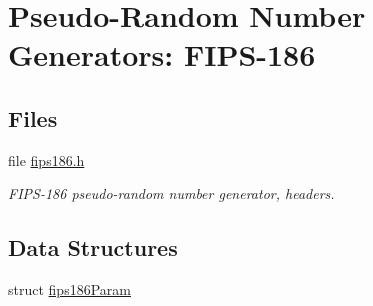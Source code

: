 \hypertarget{group__PRNG__fips186__m}{
\section{Pseudo-Random Number Generators: FIPS-186}
\label{group__PRNG__fips186__m}
}
\subsection*{Files}
\begin{CompactItemize}
\item 
file \hyperlink{fips186_8h}{fips186.h}
\begin{CompactList}\small\item\em FIPS-186 pseudo-random number generator, headers. \item\end{CompactList}

\end{CompactItemize}
\subsection*{Data Structures}
\begin{CompactItemize}
\item 
struct \hyperlink{structfips186Param}{fips186Param}
\end{CompactItemize}
